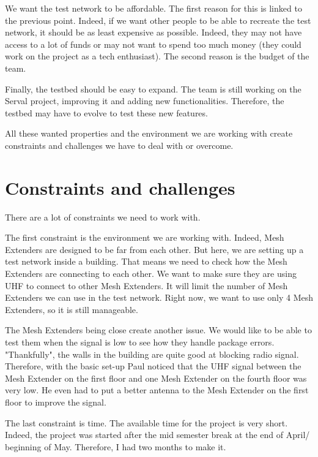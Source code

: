 We want the test network to be affordable. The first reason for this is linked to the previous point. Indeed, if we want other people to be able to recreate the test network, it should be as least expensive as possible. Indeed, they may not have access to a lot of funds or may not want to spend too much money (they could work on the project as a tech enthusiast).
The second reason is the budget of the team. 

Finally, the testbed should be easy to expand. The team is still working on the Serval project, improving it and adding new functionalities. Therefore, the testbed may have to evolve to test these new features. 

All these wanted properties and the environment we are working with create constraints and challenges we have to deal with or overcome.



\section{Constraints and challenges}


There are a lot of constraints we need to work with.

The first constraint is the environment we are working with. Indeed, Mesh Extenders are designed to be far from each other. But here, we are setting up a test network inside a building. That means we need to check how the Mesh Extenders are connecting to each other. We want to make sure they are using UHF to connect to other Mesh Extenders. It will limit the number of Mesh Extenders we can use in the test network. Right now, we want to use only 4 Mesh Extenders, so it is still manageable.

The Mesh Extenders being close create another issue. We would like to be able to test them when the signal is low to see how they handle package errors. "Thankfully", the walls in the building are quite good at blocking radio signal. Therefore, with the basic set-up Paul noticed that the UHF signal between the Mesh Extender on the first floor and one Mesh Extender on the fourth floor was very low. He even had to put a better antenna to the Mesh Extender on the first floor to improve the signal.

The last constraint is time. The available time for the project is very short. Indeed, the project was started after the mid semester break at the end of April/ beginning of May. Therefore, I had two months to make it.

